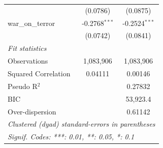\begin{tabular}{lcc}
                                                       & (0.0786)             & (0.0875)\\   
   war\_on\_terror                                     & -0.2768$^{***}$      & -0.2524$^{***}$\\   
                                                       & (0.0742)             & (0.0841)\\   
   \midrule
   \emph{Fit statistics}\\
   Observations                                        & 1,083,906            & 1,083,906\\  
   Squared Correlation                                 & 0.04111              & 0.00146\\  
   Pseudo R$^2$                                        &                      & 0.27832\\  
   BIC                                                 &                      & 53,923.4\\  
   Over-dispersion                                     &                      & 0.61142\\  
   \midrule \midrule
   \multicolumn{3}{l}{\emph{Clustered (dyad) standard-errors in parentheses}}\\
   \multicolumn{3}{l}{\emph{Signif. Codes: ***: 0.01, **: 0.05, *: 0.1}}\\
\end{tabular}
\par\endgroup


